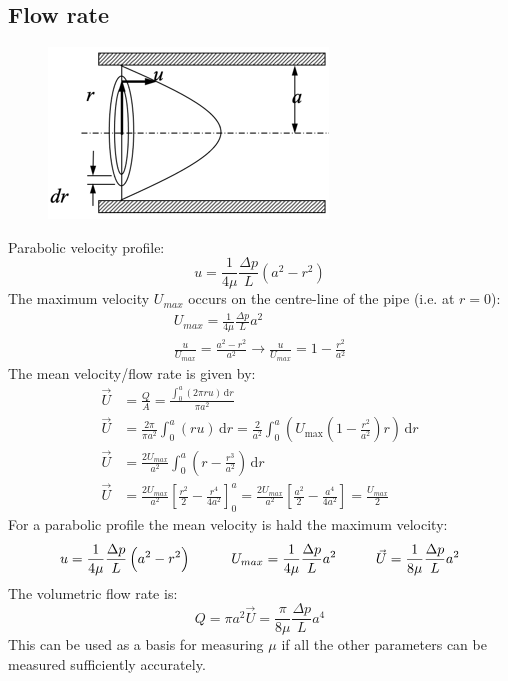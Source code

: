\documentclass[class=report, crop=false, 12pt,a4paper]{standalone}
\begin{document}
\subsection{Flow rate}
\begin{figure}[H]
  \centering
  \includegraphics[width = 0.3 \textwidth]{../img/diagram83.png}
  \caption{}
\end{figure}
Parabolic velocity profile:
\begin{equation}
  u = \frac{1}{4\mu} \frac{\Delta p}{L} \left( a^2 - r^2\right)
\end{equation}
The maximum velocity $U_{max}$ occurs on the centre-line of the pipe (i.e. at $r=0$):
\begin{gather}
  U_{max} = \frac{1}{4\mu} \frac{\Delta p}{L}a^2\\
  \frac{u}{U_{max}} = \frac{a^2 - r^2}{a^2} \rightarrow \frac{u}{U_{max}} = 1 - \frac{r^2}{a^2}
\end{gather}
The mean velocity/flow rate is given by:
\begin{align}
  \vec{U} &= \frac{Q}{A} = \frac{\int_{0}^{a} \left(2\pi r u \right) \,\textrm{d}r}{\pi a^2}\\
  \vec{U} &= \frac{2\pi}{\pi a^2} \int_{0}^{a} \left(r u \right) \,\textrm{d}r = \frac{2}{a^2} \int_{0}^{a} \left(U_{\max} \left(1 - \frac{r^2}{a^2}\right)r\right) \,\textrm{d}r \\
  \vec{U} &= \frac{2U_{max}}{a^2} \int_{0}^{a} \left(r-\frac{r^3}{a^2}\right) \,\textrm{d}r\\
  \vec{U} &= \frac{2U_{max}}{a^2} \left[ \frac{r^2}{2} - \frac{r^4}{4a^2} \right]_0^a = \frac{2U_{max}}{a^2} \left[ \frac{a^2}{2} - \frac{a^4}{4a^2} \right] = \frac{U_{max}}{2} 
\end{align}
For a parabolic profile the mean velocity is hald the maximum velocity:
\begin{equation}
  u = \frac{1}{4\mu} \frac{\Delta p}{L} \left(a^2 - r^2\right) \makebox[1cm]{} U_{max} = \frac{1}{4\mu} \frac{\Delta p }{L} a^2 \makebox[1cm]{} \vec{U} = \frac{1}{8\mu}\frac{\Delta p}{L} a^2
\end{equation}
The volumetric flow rate is: 
\begin{equation}
  Q = \pi a^2 \vec{U} = \frac{\pi}{8\mu}\frac{\Delta p}{L} a^4
\end{equation}
This can be used as a basis for measuring $\mu$ if all the other parameters can be measured sufficiently accurately.
\end{document}

